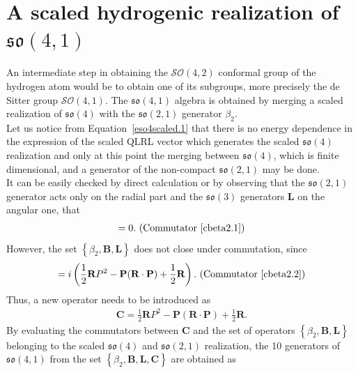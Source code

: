 \documentclass[12pt,a4paper]{report}
\theoremstyle{definition}
\theoremstyle{remark}
\theoremstyle{remark}
\begin{document}
\section{A scaled hydrogenic realization of $\mathfrak{so}(4,1)$}
An intermediate step in obtaining the $\mathcal{SO}(4,2)$ conformal group of the hydrogen atom would be to obtain one of its subgroups, more precisely the de Sitter group $\mathcal{SO}(4,1)$. The $\mathfrak{so}(4,1)$ algebra is obtained by merging a scaled realization of $\mathfrak{so}(4)$ with the $\mathfrak{so}(2,1)$ generator $\beta_2$.  \\ \indent
Let us notice from Equation~\ref{eso4scaled.1} that there is no energy dependence in the expression of the scaled QLRL vector which generates the scaled $\mathfrak{so}(4)$ realization and only at this point the merging between $\mathfrak{so}(4)$, which is finite dimensional, and a generator of the non-compact $\mathfrak{so}(2,1)$ may be done.\\
It can be easily checked by direct calculation or by observing that the $\mathfrak{so}(2,1)$ generator acts only on the radial part and the $\mathfrak{so}(3)$ generators $\textbf{L}$ on the angular one, that
\begin{align*}
[\beta_2,\textbf{L}]=0. \text{ (Commutator~\ref{cbeta2.1})}
\end{align*}
However, the set $\left\lbrace \beta_2,\textbf{B},\textbf{L}\right\rbrace$ does not close under commutation, since
\begin{align*}
[\beta_2,\textbf{B}]=i\left(\frac{1}{2}\textbf{R}P^2-\textbf{P}(\textbf{R}\cdot\textbf{P})+\frac{1}{2}\textbf{R}\right). \text{ (Commutator~\ref{cbeta2.2})}
\end{align*}
Thus, a new operator needs to be introduced as
\begin{align*}
\textbf{C}=\frac{1}{2}\textbf{R}P^2-\textbf{P}(\textbf{R}\cdot\textbf{P})+\frac{1}{2}\textbf{R}.
\end{align*}
By evaluating the commutators between $\textbf{C}$ and the set of operators $\left\lbrace \beta_2,\textbf{B},\textbf{L}\right\rbrace$ belonging to the scaled $\mathfrak{so}(4)$ and $\mathfrak{so}(2,1)$ realization, the 10 generators of $\mathfrak{so}(4,1)$ from the set $\left\lbrace \beta_2,\textbf{B},\textbf{L}, \textbf{C}\right\rbrace$ are obtained as
\end{document}
